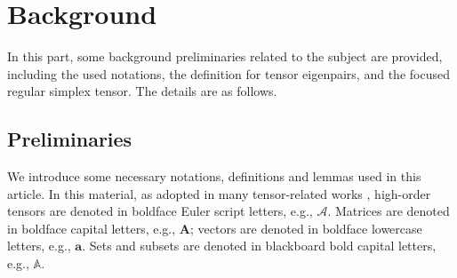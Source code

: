 \documentclass{elsarticle}
\begin{document}
\section{Background}\label{pre}
In this part, 
some 
background  preliminaries   related to the subject are provided,  including 
the used notations, 
the  definition  for  
tensor  eigenpairs,  and  the  focused regular simplex tensor. 
The  details are as  follows.

\subsection{Preliminaries}\label{notation}
We    introduce  some  necessary   notations, definitions   and  lemmas used  in   this  article. 
In  this  material,  as adopted in  many tensor-related works \cite{kolda,TensorPCA,9521829},  high-order tensors are denoted
in
boldface Euler script letters, e.g.,
$\mathcal  A $.
Matrices are denoted  in   boldface capital letters, e.g., $\mathbf  A $; vectors are denoted in  
boldface lowercase letters, e.g.,  $\mathbf  a $.
Sets and subsets are denoted  in blackboard bold  capital letters, e.g.,  $\mathbb  A $.
\end{document}
